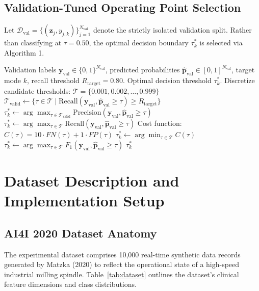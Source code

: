 \documentclass[conference]{IEEEtran}
\begin{document}
\subsection{Validation-Tuned Operating Point Selection}
Let $\mathcal{D}_{\text{val}} = \{(\mathbf{z}_j, y_{j,k})\}_{j=1}^{N_{\text{val}}}$ denote the strictly isolated validation split. Rather than classifying at $\tau = 0.50$, the optimal decision boundary $\tau_k^*$ is selected via Algorithm 1.

\begin{algorithm}[h]
\caption{Aegis Validation-Tuned Operating Point Selection}
\begin{algorithmic}[1]
\REQUIRE Validation labels $\mathbf{y}_{\text{val}} \in \{0, 1\}^{N_{\text{val}}}$, predicted probabilities $\hat{\mathbf{p}}_{\text{val}} \in [0, 1]^{N_{\text{val}}}$, target mode $k$, recall threshold $R_{\text{target}} = 0.80$.
\ENSURE Optimal decision threshold $\tau_k^*$.
\STATE Discretize candidate thresholds: $\mathcal{T} = \{0.001, 0.002, \dots, 0.999\}$
    \STATE $\mathcal{T}_{\text{valid}} \leftarrow \{\tau \in \mathcal{T} \mid \text{Recall}(\mathbf{y}_{\text{val}}, \hat{\mathbf{p}}_{\text{val}} \ge \tau) \ge R_{\text{target}}\}$
        \STATE $\tau_k^* \leftarrow \arg\max_{\tau \in \mathcal{T}_{\text{valid}}} \text{Precision}(\mathbf{y}_{\text{val}}, \hat{\mathbf{p}}_{\text{val}} \ge \tau)$
    \ELSE
        \STATE $\tau_k^* \leftarrow \arg\max_{\tau \in \mathcal{T}} \text{Recall}(\mathbf{y}_{\text{val}}, \hat{\mathbf{p}}_{\text{val}} \ge \tau)$
    \ENDIF
{}
    \STATE Cost function: $C(\tau) = 10 \cdot FN(\tau) + 1 \cdot FP(\tau)$
    \STATE $\tau_k^* \leftarrow \arg\min_{\tau \in \mathcal{T}} C(\tau)$
\ELSE
    \STATE $\tau_k^* \leftarrow \arg\max_{\tau \in \mathcal{T}} F_1(\mathbf{y}_{\text{val}}, \hat{\mathbf{p}}_{\text{val}} \ge \tau)$
\ENDIF
\RETURN $\tau_k^*$
\end{algorithmic}
\end{algorithm}

\section{Dataset Description and Implementation Setup}

\subsection{AI4I 2020 Dataset Anatomy}
The experimental dataset comprises 10,000 real-time synthetic data records generated by Matzka (2020) to reflect the operational state of a high-speed industrial milling spindle. Table~\ref{tab:dataset} outlines the dataset's clinical feature dimensions and class distributions.
\end{document}
